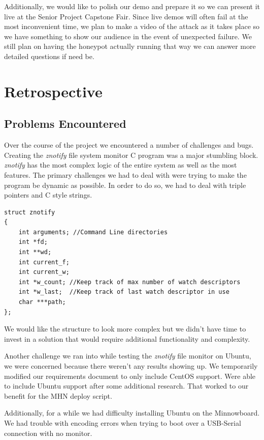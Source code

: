 \documentclass[10pt,conference,draftclsnofoot,onecolumn]{IEEEtran}
\begin{document}
Additionally, we would like to polish our demo and prepare it so we can present it live at the Senior Project Capstone Fair. Since live demos will often fail at the most inconvenient time, we plan to make a video of the attack as it takes place so we have something to show our audience in the event of unexpected failure. We still plan on having the honeypot actually running that way we can answer more detailed questions if need be. 


\section{Retrospective}
\subsection{Problems Encountered}
Over the course of the project we encountered a number of challenges and bugs. Creating the \textit{znotify} file system monitor C program was a major stumbling block. \textit{znotify} has the most complex logic of the entire system as well as the most features. The primary challenges we had to deal with were trying to make the program be dynamic as possible. In order to do so, we had to deal with triple pointers and C style strings. 

\begin{lstlisting}
struct znotify
{
	int arguments; //Command Line directories
	int *fd;      
	int **wd;
	int current_f; 
	int current_w;
	int *w_count; //Keep track of max number of watch descriptors
	int *w_last;  //Keep track of last watch descriptor in use
	char ***path;
};
\end{lstlisting}

We would like the structure to look more complex but we didn't have time to invest in a solution that would require additional functionality and complexity. 

Another challenge we ran into while testing the \textit{znotify} file monitor on Ubuntu, we were concerned because there weren’t any results showing up. We temporarily modified our requirements document to only include CentOS support. Were able to include Ubuntu support after some additional research. That worked to our benefit for the MHN deploy script. 

Additionally, for a while we had difficulty installing Ubuntu on the Minnowboard. We had trouble with encoding errors when trying to boot over a USB-Serial connection with no monitor.
\end{document}
